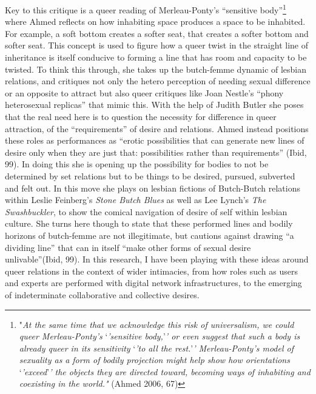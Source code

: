 Key to this critique is a queer reading of Merleau-Ponty's ``sensitive
body''\footnote{"\emph{At the same time that we acknowledge this risk of
  universalism, we could queer Merleau-Ponty's }`\emph{'sensitive
  body,}'\emph{' or even suggest that such a body is already queer in
  its sensitivity }`\emph{'to all the rest.}'\emph{' Merleau-Ponty's
  model of sexuality as a} \emph{form of bodily projection might help
  show how orientations }`\emph{'exceed}'\emph{' the objects they are
  directed toward, becoming ways of inhabiting and coexisting in the
  world."} (Ahmed 2006, 67)} where Ahmed reflects on how inhabiting
space produces a space to be inhabited. For example, a soft bottom
creates a softer seat, that creates a softer bottom and softer seat.
This concept is used to figure how a queer twist in the straight line of
inheritance is itself conducive to forming a line that has room and
capacity to be twisted. To think this through, she takes up the
butch-femme dynamic of lesbian relations, and critiques not only the
hetero perception of needing sexual difference or an opposite to attract
but also queer critiques like Joan Nestle's ``phony heterosexual
replicas'' that mimic this. With the help of Judith Butler she poses
that the real need here is to question the necessity for difference in
queer attraction, of the ``requirements'' of desire and relations. Ahmed
instead positions these roles as performances as ``erotic possibilities
that can generate new lines of desire only when they are just that:
possibilities rather than requirements'' (Ibid, 99). In doing this she
is opening up the possibility for bodies to not be determined by set
relations but to be things to be desired, pursued, subverted and felt
out. In this move she plays on lesbian fictions of Butch-Butch relations
within Leslie Feinberg's \emph{Stone Butch Blues} as well as Lee Lynch's
\emph{The Swashbuckler}, to show the comical navigation of desire of
self within lesbian culture. She turns here though to state that these
performed lines and bodily horizons of butch-femme are not illegitimate,
but cautions against drawing ``a dividing line'' that can in itself
``make other forms of sexual desire unlivable''(Ibid, 99). In this
research, I have been playing with these ideas around queer relations in
the context of wider intimacies, from how roles such as users and
experts are performed with digital network infrastructures, to the
emerging of indeterminate collaborative and collective desires.

